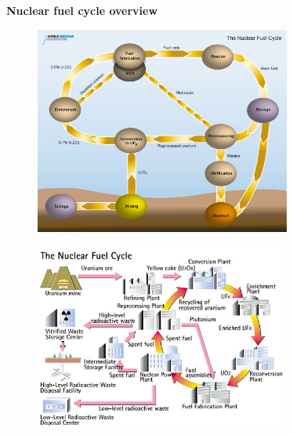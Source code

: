 \documentclass[aspectratio=1610,pdftex,dvipsnames,compress,xcolor={dvipsnames}]{beamer}
\begin{document}
\begin{frame}[plain]{}
    \centering\LARGE\textbf{Nuclear fuel cycle overview}
\end{frame}


\addtocounter{framenumber}{-1} 
\begin{frame}{}
    \begin{figure}
        \centering
        \includegraphics[width=0.75\textwidth]{nuclear.fuel.cycle1.jpg}
    \end{figure}
\end{frame}


\begin{frame}{}
    \begin{figure}
        \centering
        \includegraphics[width=0.75\textwidth]{nuclear.fuel.cycle2.jpg}
    \end{figure}
\end{frame}
\end{document}
